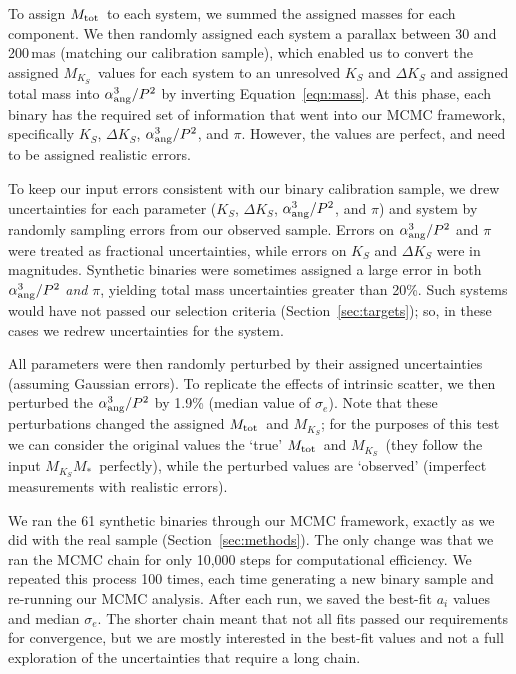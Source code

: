 \documentclass[twocolumn]{aastex62}
\newcommand{\mks}{$M_{K_S}$}
\newcommand{\mmk}{$M_{K_S}$\textendash$M_*$}
\newcommand{\mtot}{$M_{\rm{tot}}$}
\begin{document}
To assign \mtot\ to each system, we summed the assigned masses for each component. We then randomly assigned each system a parallax between 30 and 200\,mas (matching our calibration sample), which enabled us to convert the assigned \mks\ values for each system to an unresolved $K_S$ and $\Delta K_S$ and assigned total mass into $\alpha_{\rm{ang}}^3/P^2$ by inverting Equation~\ref{eqn:mass}. At this phase, each binary has the required set of information that went into our MCMC framework, specifically $K_S$, $\Delta K_S$, $\alpha_{\rm{ang}}^3/P^2$, and $\pi$. However, the values are perfect, and need to be assigned realistic errors. 

To keep our input errors consistent with our binary calibration sample, we drew uncertainties for each parameter ($K_S$, $\Delta K_S$, $\alpha_{\rm{ang}}^3/P^2$, and $\pi$) and system by randomly sampling errors from our observed sample. Errors on $\alpha_{\rm{ang}}^3/P^2$ and $\pi$ were treated as fractional uncertainties, while errors on $K_S$ and $\Delta K_S$ were in magnitudes. Synthetic binaries were sometimes assigned a large error in both $\alpha_{\rm{ang}}^3/P^2$ {\it and} $\pi$, yielding total mass uncertainties greater than 20\%. Such systems would have not passed our selection criteria (Section~\ref{sec:targets}); so, in these cases we redrew uncertainties for the system. 

All parameters were then randomly perturbed by their assigned uncertainties (assuming Gaussian errors). To replicate the effects of intrinsic scatter, we then perturbed the $\alpha_{\rm{ang}}^3/P^2$ by 1.9\% (median value of $\sigma_e$). Note that these perturbations changed the assigned \mtot\ and \mks; for the purposes of this test we can consider the original values the `true' \mtot\ and \mks\ (they follow the input \mmk\ perfectly), while the perturbed values are `observed' (imperfect measurements with realistic errors). 

We ran the 61 synthetic binaries through our MCMC framework, exactly as we did with the real sample (Section~\ref{sec:methods}). The only change was that we ran the MCMC chain for only 10,000 steps for computational efficiency. We repeated this process 100 times, each time generating a new binary sample and re-running our MCMC analysis. After each run, we saved the best-fit $a_i$ values and median $\sigma_e$. The shorter chain meant that not all fits passed our requirements for convergence, but we are mostly interested in the best-fit values and not a full exploration of the uncertainties that require a long chain. 
\end{document}
